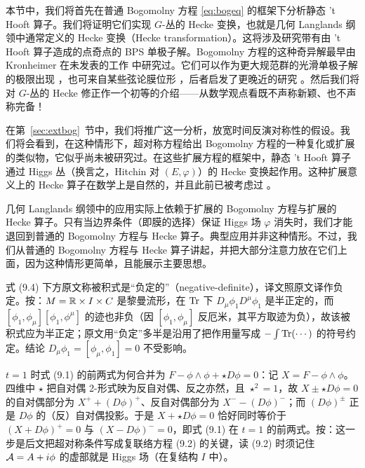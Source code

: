 本节中，我们将首先在普通 Bogomolny 方程 \eqref{eq:bogeq} 的框架下分析静态 't Hooft 算子。我们将证明它们实现 $G$-丛的 Hecke 变换，也就是几何 Langlands 纲领中通常定义的 Hecke 变换（Hecke transformation）。这将涉及研究带有由 't Hooft 算子造成的点奇点的 BPS 单极子解。Bogomolny 方程的这种奇异解最早由 Kronheimer 在未发表的工作 \cite{ref110} 中研究过。它们可以作为更大规范群的光滑单极子解的极限出现 
\cite{ref111,ref112,ref113,ref114}，也可来自某些弦论膜位形 \cite{ref115}，后者启发了更晚近的研究 
\cite{ref116,ref117,ref118}。然后我们将对 $G$-丛的 Hecke 修正作一个初等的介绍——从数学观点看既不声称新颖、也不声称完备！

在第~\ref{sec:extbog}~节中，我们将推广这一分析，放宽时间反演对称性的假设。我们将会看到，在这种情形下，超对称方程给出 Bogomolny 方程的一种复化或扩展的类似物，它似乎尚未被研究过。在这些扩展方程的框架中，静态 't Hooft 算子通过 Higgs 丛（换言之，Hitchin 对 $(E,\varphi)$）的 Hecke 变换起作用。这种扩展意义上的 Hecke 算子在数学上是自然的，并且此前已被考虑过 
\cite{ref119,ref120}。

几何 Langlands 纲领中的应用实际上依赖于扩展的 Bogomolny 方程与扩展的 Hecke 算子。只有当边界条件（即膜的选择）保证 Higgs 场 $\varphi$ 消失时，我们才能退回到普通的 Bogomolny 方程与 Hecke 算子。典型应用并非这种情形。不过，我们从普通的 Bogomolny 方程与 Hecke 算子讲起，并把大部分注意力放在它们上面，因为这种情形更简单，且能展示主要思想。

\begin{yizhu}[原文疑误]
式 (9.4) 下方原文称被积式是“负定的”（negative-definite），译文照原文译作负定。按：$M=\Bbb{R}\times I\times C$ 是黎曼流形，在 $\Tr$ 下 $D_\mu\phi_1D^\mu\phi_1$ 是半正定的，而 $[\phi_1,\phi_\mu][\phi_1,\phi^\mu]$ 的迹也非负（因 $[\phi_1,\phi_\mu]$ 反厄米，其平方取迹为负），故该被积式应为半正定；原文用“负定”多半是沿用了把作用量写成 $-\int\Tr(\cdots)$ 的符号约定。结论 $D_\mu\phi_1=[\phi_\mu,\phi_1]=0$ 不受影响。
\end{yizhu}

\begin{yizhu}[易错点]
$t=1$ 时式 (9.1) 的前两式为何合并为 $F-\phi\wedge\phi+\star D\phi=0$：记 $X=F-\phi\wedge\phi$。四维中 $\star$ 把自对偶 2-形式映为反自对偶、反之亦然，且 $\star^2=1$，故 $X\pm\star D\phi=0$ 的自对偶部分为 $X^+ +(D\phi)^+$、反自对偶部分为 $X^--(D\phi)^-$；而 $(D\phi)^\pm$ 正是 $D\phi$ 的（反）自对偶投影。于是 $X+\star D\phi=0$ 恰好同时等价于 $(X+D\phi)^+=0$ 与 $(X-D\phi)^-=0$，即式 (9.1) 在 $t=1$ 的前两式。按：这一步是后文把超对称条件写成复联络方程 (9.2) 的关键，读 (9.2) 时须记住 $\CA=A+i\phi$ 的虚部就是 Higgs 场（在复结构 $I$ 中）。
\end{yizhu}

